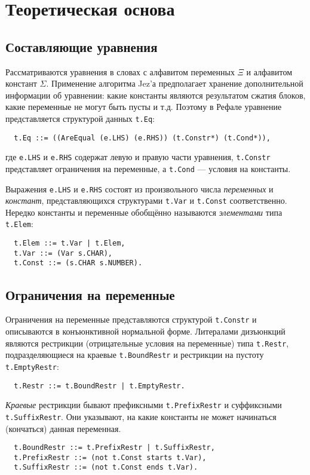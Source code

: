 \documentclass[12pt]{article}
\begin{document}
\section{Теоретическая основа}

\subsection{Составляющие уравнения}

Рассматриваются уравнения в словах с алфавитом переменных $\Xi$ и алфавитом
констант $\Sigma$. Применение алгоритма Jez'а предполагает хранение
дополнительной информации об уравнении: какие константы являются результатом
сжатия блоков, какие переменные не могут быть пусты и т.д. Поэтому в Рефале
уравнение представляется структурой данных \texttt{t.Eq}:
\begin{Verbatim}
  t.Eq ::= ((AreEqual (e.LHS) (e.RHS)) (t.Constr*) (t.Cond*)),
\end{Verbatim}
где \texttt{e.LHS} и \texttt{e.RHS} содержат левую и правую части уравнения,
\texttt{t.Constr} представляет ограничения на переменные, а \texttt{t.Cond}
--- условия на константы.

Выражения \texttt{e.LHS} и \texttt{e.RHS} состоят из произвольного числа
\textit{переменных} и \textit{констант}, представляющихся структурами
\texttt{t.Var} и \texttt{t.Const} соответственно. Нередко константы и переменные
обобщённо называются \textit{элементами} типа \texttt{t.Elem}:
\begin{Verbatim}
  t.Elem ::= t.Var | t.Elem,
  t.Var ::= (Var s.CHAR),
  t.Const ::= (s.CHAR s.NUMBER).
\end{Verbatim}

\subsection{Ограничения на переменные}

Ограничения на переменные представляются структурой \texttt{t.Constr} и
описываются в конъюнктивной нормальной форме. Литералами дизъюнкций являются
рестрикции (отрицательные условия на переменные) типа \texttt{t.Restr},
подразделяющиеся на краевые \texttt{t.BoundRestr} и рестрикции на пустоту
\texttt{t.EmptyRestr}:
\begin{Verbatim}
  t.Restr ::= t.BoundRestr | t.EmptyRestr.
\end{Verbatim}

\textit{Краевые} рестрикции бывают префиксными \texttt{t.PrefixRestr} и
суффиксными \texttt{t.SuffixRestr}. Они указывают, на какие константы не может
начинаться (кончаться) данная переменная.
\begin{Verbatim}
  t.BoundRestr ::= t.PrefixRestr | t.SuffixRestr,
  t.PrefixRestr ::= (not t.Const starts t.Var),
  t.SuffixRestr ::= (not t.Const ends t.Var).
\end{Verbatim}
\end{document}

